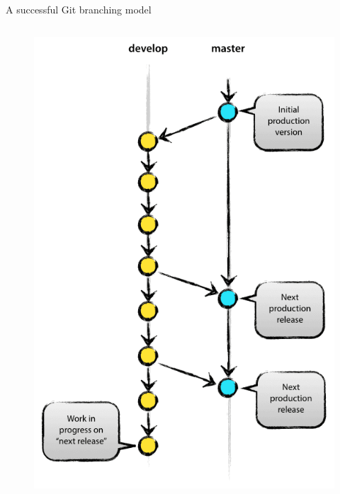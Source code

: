 \documentclass[10pt, aspectratio=169, xcolor=dvipsnames]{beamer}
\begin{document}
\begin{frame}[t]{A successful Git branching model}
\begin{columns}
        \begin{column}[t]{0.25\textwidth}
            \begin{figure}
                \includegraphics[width = \textwidth]{mainbr.png}
            \end{figure}
        \end{column}
    \end{columns}
\end{frame}
\end{document}
